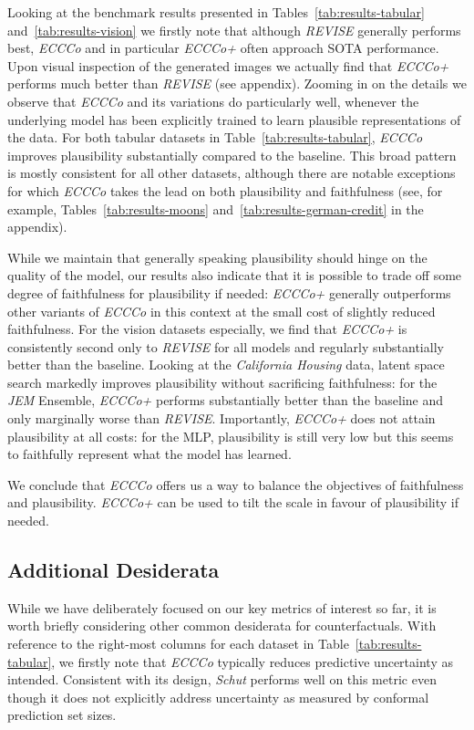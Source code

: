 Looking at the benchmark results presented in Tables~\ref{tab:results-tabular} and~\ref{tab:results-vision} we firstly note that although \textit{REVISE} generally performs best, \textit{ECCCo} and in particular \textit{ECCCo+} often approach SOTA performance. Upon visual inspection of the generated images we actually find that \textit{ECCCo+} performs much better than \textit{REVISE} (see appendix). Zooming in on the details we observe that \textit{ECCCo} and its variations do particularly well, whenever the underlying model has been explicitly trained to learn plausible representations of the data. For both tabular datasets in Table~\ref{tab:results-tabular}, \textit{ECCCo} improves plausibility substantially compared to the baseline. This broad pattern is mostly consistent for all other datasets, although there are notable exceptions for which \textit{ECCCo} takes the lead on both plausibility and faithfulness (see, for example, Tables~\ref{tab:results-moons} and~\ref{tab:results-german-credit} in the appendix). 

While we maintain that generally speaking plausibility should hinge on the quality of the model, our results also indicate that it is possible to trade off some degree of faithfulness for plausibility if needed: \textit{ECCCo+} generally outperforms other variants of \textit{ECCCo} in this context at the small cost of slightly reduced faithfulness. For the vision datasets especially, we find that  \textit{ECCCo+} is consistently second only to \textit{REVISE} for all models and regularly substantially better than the baseline. Looking at the \textit{California Housing} data, latent space search markedly improves plausibility without sacrificing faithfulness: for the \textit{JEM} Ensemble, \textit{ECCCo+} performs substantially better than the baseline and only marginally worse than \textit{REVISE}. Importantly, \textit{ECCCo+} does not attain plausibility at all costs: for the MLP, plausibility is still very low but this seems to faithfully represent what the model has learned. 

We conclude that \textit{ECCCo} offers us a way to balance the objectives of faithfulness and plausibility. \textit{ECCCo+} can be used to tilt the scale in favour of plausibility if needed.

\subsection{Additional Desiderata}

While we have deliberately focused on our key metrics of interest so far, it is worth briefly considering other common desiderata for counterfactuals. With reference to the right-most columns for each dataset in Table~\ref{tab:results-tabular}, we firstly note that \textit{ECCCo} typically reduces predictive uncertainty as intended. Consistent with its design, \textit{Schut} performs well on this metric even though it does not explicitly address uncertainty as measured by conformal prediction set sizes. 

